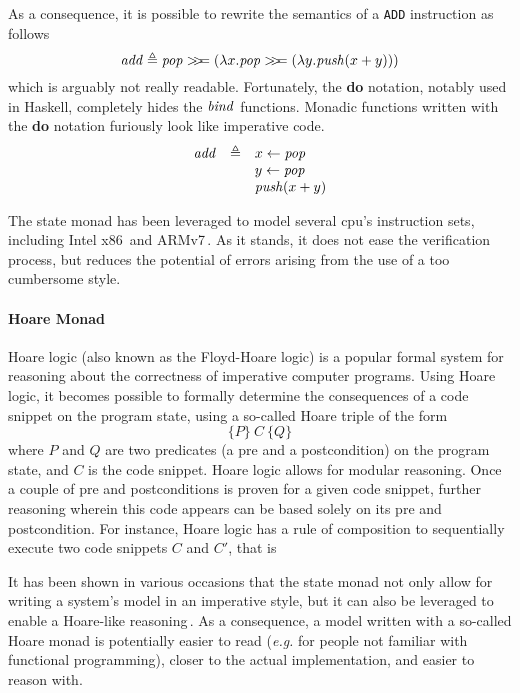 As a consequence, it is possible to rewrite the semantics of a \texttt{ADD}
instruction as follows
%
\[
  \func{add} \triangleq \func{pop} \bind (\lambda x. \func{pop} \bind (\lambda
  y. \func{push}(x + y)))
\]
%
which is arguably not really readable.
%
Fortunately, the \textbf{do} notation, notably used in Haskell, completely hides
the $\func{bind}$ functions.
%
Monadic functions written with the \textbf{do} notation furiously look like
imperative code.
%
\[
  \begin{array}{rcl}
    \func{add} &\triangleq& x \leftarrow \func{pop} \\
               &          & y \leftarrow \func{pop} \\
               &          & \func{push}(x + y)
  \end{array}
\]

The state monad has been leveraged to model several \ac{cpu}'s instruction sets,
including Intel x86\,\cite{morrisett2012rocksalt} and
ARMv7\,\cite{fox2010armv7}.
%
As it stands, it does not ease the verification process, but reduces the
potential of errors arising from the use of a too cumbersome style.

\paragraph{Hoare Monad}
%
Hoare logic (also known as the Floyd-Hoare logic) is a popular formal system for
reasoning about the correctness of imperative computer programs.
%
Using Hoare logic, it becomes possible to formally determine the consequences of
a code snippet on the program state, using a so-called Hoare triple of the form
%
\[ \{P\}\ C\ \{Q\} \]
%
where $P$ and $Q$ are two predicates (a pre and a postcondition) on the program
state, and $C$ is the code snippet.
%
Hoare logic allows for modular reasoning.
%
Once a couple of pre and postconditions is proven for a given code snippet,
further reasoning wherein this code appears can be based solely on its pre and
postcondition.
%
For instance, Hoare logic has a rule of composition to sequentially execute two
code snippets $C$ and $C'$, that is

\begin{prooftree}
   
\end{prooftree}

It has been shown in various occasions that the state monad not only allow for
writing a system's model in an imperative style, but it can also be leveraged to
enable a Hoare-like reasoning\,\cite{chlipala2009ynot,jomaa2016mmu}.
%
As a consequence, a model written with a so-called Hoare monad is potentially
easier to read (\emph{e.g.} for people not familiar with functional
programming), closer to the actual implementation, and easier to reason with.

